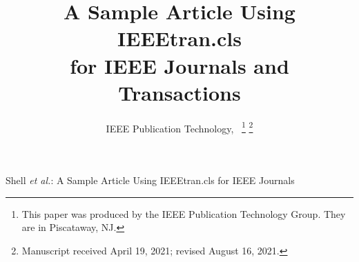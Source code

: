 \documentclass[letterpaper,journal]{IEEEtran}
\begin{document}
\title{A Sample Article Using IEEEtran.cls\\ for IEEE Journals and Transactions}

\author{IEEE Publication Technology,~
\thanks{This paper was produced by the IEEE Publication Technology Group. They are in Piscataway, NJ.}%
\thanks{Manuscript received April 19, 2021; revised August 16, 2021.}}

%
{Shell \MakeLowercase{\textit{et al.}}: A Sample Article Using IEEEtran.cls for IEEE Journals}


\end{document}
